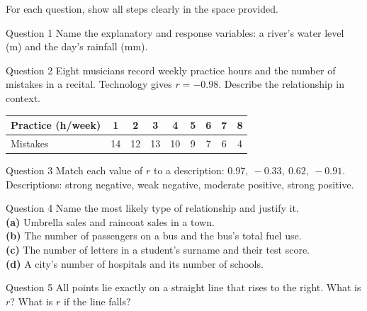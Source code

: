 \documentclass[11pt]{article}
\begin{document}
\clearpage
{}
For each question, show all steps clearly in the space provided.

\begin{qbox}{Question 1}
Name the explanatory and response variables: a river's water level (m) and the day's rainfall (mm).\workspace{1.6cm}
\end{qbox}

\begin{qbox}{Question 2}
Eight musicians record weekly practice hours and the number of mistakes in a recital. Technology gives $r=-0.98$. Describe the relationship in context.\begin{center}\footnotesize\begin{tabular}{|l|*{8}{c|}}\hline Practice (h/week) & 1 & 2 & 3 & 4 & 5 & 6 & 7 & 8 \\ \hline Mistakes & 14 & 12 & 13 & 10 & 9 & 7 & 6 & 4 \\ \hline\end{tabular}\end{center}\workspace{2.2cm}
\end{qbox}

\begin{qbox}{Question 3}
Match each value of $r$ to a description: $0.97,\ -0.33,\ 0.62,\ -0.91$. Descriptions: strong negative, weak negative, moderate positive, strong positive.\workspace{2.4cm}
\end{qbox}

\begin{qbox}{Question 4}
Name the most likely type of relationship and justify it. \\ \textbf{(a)} Umbrella sales and raincoat sales in a town. \\ \textbf{(b)} The number of passengers on a bus and the bus's total fuel use. \\ \textbf{(c)} The number of letters in a student's surname and their test score. \\ \textbf{(d)} A city's number of hospitals and its number of schools.\workspace{3.4cm}
\end{qbox}

\begin{qbox}{Question 5}
All points lie exactly on a straight line that rises to the right. What is $r$? What is $r$ if the line falls?\workspace{2cm}
\end{qbox}
\end{document}
